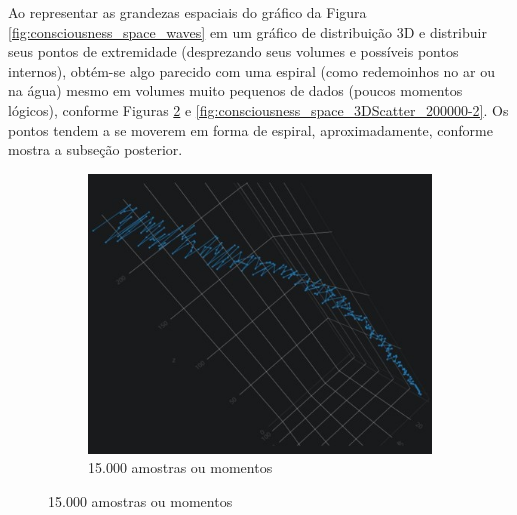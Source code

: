 Ao representar as grandezas espaciais do gráfico da Figura \ref{fig:consciousness_space_waves} em um gráfico de distribuição 3D e distribuir seus pontos de extremidade (desprezando seus volumes e possíveis pontos internos), obtém-se algo parecido com uma espiral (como redemoinhos no ar ou na água) mesmo em volumes muito pequenos de dados (poucos momentos lógicos), conforme Figuras \ref{fig:consciousness_space_3DScatter15000-10} e \ref{fig:consciousness_space_3DScatter_200000-2}. Os pontos tendem a se moverem em forma de espiral, aproximadamente, conforme mostra a subseção posterior. 
	\begin{figure}[H]
	\centering
		\begin{subfigure}[H]{0.47\linewidth}
		\centering
		\includegraphics[width=1\linewidth]{sections/images/consciousness_space_3DScatter15000-10.jpg}
		\caption{15.000 amostras ou momentos}
		\label{fig:consciousness_space_3DScatter15000-10}
		\end{subfigure}
	

\end{figure}
